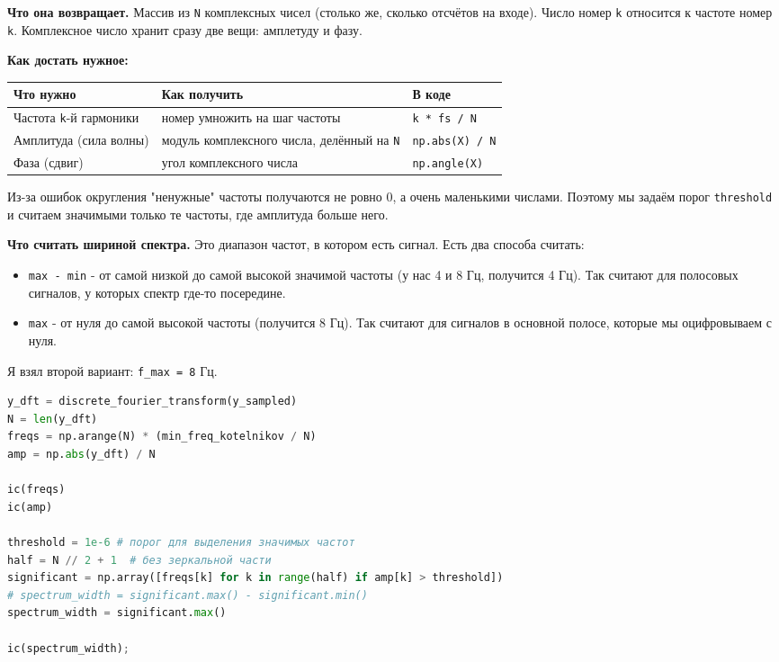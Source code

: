\documentclass[a4paper,14pt,oneside,openany]{memoir}
\begin{document}
\textbf{Что она возвращает.} Массив из \texttt{N} комплексных чисел (столько же, сколько отсчётов на входе). Число номер \texttt{k} относится к частоте номер \texttt{k}. Комплексное число хранит сразу две вещи: амплетуду и фазу.

\textbf{Как достать нужное:}

\begin{center}
\begin{tabular}{|p{4.6cm}|p{5.6cm}|p{4cm}|}
\hline
Что нужно & Как получить & В коде \\
\hline
Частота \texttt{k}-й гармоники & номер умножить на шаг частоты & \texttt{k * fs / N} \\
\hline
Амплитуда (сила волны) & модуль комплексного числа, делённый на \texttt{N} & \texttt{np.abs(X) / N} \\
\hline
Фаза (сдвиг) & угол комплексного числа & \texttt{np.angle(X)} \\
\hline
\end{tabular}
\end{center}

Из-за ошибок округления "ненужные" частоты получаются не ровно 0, а очень маленькими числами. Поэтому мы задаём порог \texttt{threshold} и считаем значимыми только те частоты, где амплитуда больше него.

\textbf{Что считать шириной спектра.} Это диапазон частот, в котором есть сигнал. Есть два способа считать:

\begin{itemize}
\item \texttt{max - min} - от самой низкой до самой высокой значимой частоты (у нас 4 и 8 Гц, получится 4 Гц). Так считают для полосовых сигналов, у которых спектр где-то посередине.
\item \texttt{max} - от нуля до самой высокой частоты (получится 8 Гц). Так считают для сигналов в основной полосе, которые мы оцифровываем с нуля.
\end{itemize}

Я взял второй вариант: \texttt{f\_max = 8} Гц.

\begin{lstlisting}[language=Python, caption={Прямое ДПФ и оценка ширины спектра}]
y_dft = discrete_fourier_transform(y_sampled)
N = len(y_dft)
freqs = np.arange(N) * (min_freq_kotelnikov / N)
amp = np.abs(y_dft) / N

ic(freqs)
ic(amp)

threshold = 1e-6 # порог для выделения значимых частот
half = N // 2 + 1  # без зеркальной части
significant = np.array([freqs[k] for k in range(half) if amp[k] > threshold])
# spectrum_width = significant.max() - significant.min()
spectrum_width = significant.max()

ic(spectrum_width);
\end{lstlisting}
\end{document}
